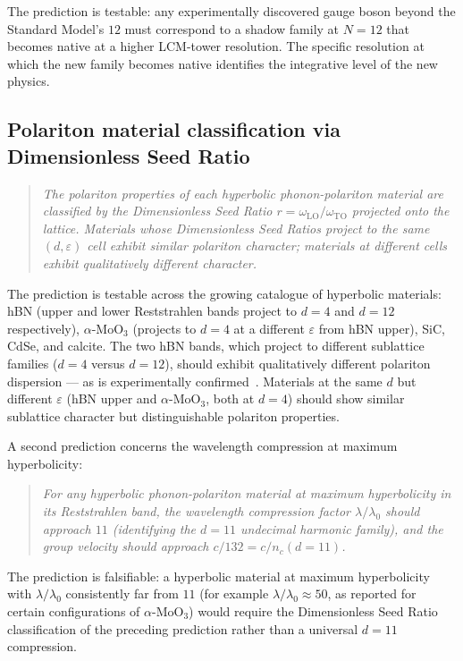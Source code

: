 \documentclass[11pt,a4paper]{article}
\theoremstyle{definition}
\theoremstyle{remark}
\begin{document}
The prediction is testable: any experimentally discovered gauge boson beyond the Standard Model's $12$ must correspond to a shadow family at $N = 12$ that becomes native at a higher LCM-tower resolution. The specific resolution at which the new family becomes native identifies the integrative level of the new physics.

\subsection{Polariton material classification via Dimensionless Seed Ratio}\label{subsec:polariton-prediction}

\begin{quote}\itshape
The polariton properties of each hyperbolic phonon-polariton material are classified by the Dimensionless Seed Ratio $r = \omega_{\mathrm{LO}}/\omega_{\mathrm{TO}}$ projected onto the lattice. Materials whose Dimensionless Seed Ratios project to the same $(d, \varepsilon)$ cell exhibit similar polariton character; materials at different cells exhibit qualitatively different character.
\end{quote}

The prediction is testable across the growing catalogue of hyperbolic materials: hBN (upper and lower Reststrahlen bands project to $d=4$ and $d=12$ respectively), $\alpha$-MoO$_{3}$ (projects to $d=4$ at a different $\varepsilon$ from hBN upper), SiC, CdSe, and calcite. The two hBN bands, which project to different sublattice families ($d=4$ versus $d=12$), should exhibit qualitatively different polariton dispersion --- as is experimentally confirmed~\cite{Bucher2025}. Materials at the same $d$ but different $\varepsilon$ (hBN upper and $\alpha$-MoO$_{3}$, both at $d=4$) should show similar sublattice character but distinguishable polariton properties.

A second prediction concerns the wavelength compression at maximum hyperbolicity:

\begin{quote}\itshape
For any hyperbolic phonon-polariton material at maximum hyperbolicity in its Reststrahlen band, the wavelength compression factor $\lambda/\lambda_{0}$ should approach $11$ (identifying the $d=11$ undecimal harmonic family), and the group velocity should approach $c/132 = c/n_{c}(d{=}11)$.
\end{quote}

The prediction is falsifiable: a hyperbolic material at maximum hyperbolicity with $\lambda/\lambda_{0}$ consistently far from $11$ (for example $\lambda/\lambda_{0} \approx 50$, as reported for certain configurations of $\alpha$-MoO$_{3}$) would require the Dimensionless Seed Ratio classification of the preceding prediction rather than a universal $d=11$ compression.
\end{document}
